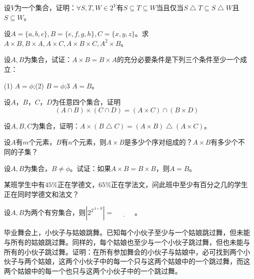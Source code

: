 \documentclass{article}
\begin{document}
\begin{CJK}{UTF8}{gbsn}
\begin{Exercise}
  设$V$为一个集合，证明：$\forall S,T,W \in 2^V$有$S \subseteq T \subseteq W$当且仅当$S \bigtriangleup T \subseteq S \bigtriangleup W$且$S \subseteq W$。
\end{Exercise}

\begin{Exercise}
  设$A=\{a,b,c\}, B=\{e,f,g,h\}, C=\{x,y,z\}$。求$A\times B, B\times A, A\times C, A\times B \times C, A^2\times B$。
\end{Exercise}

\begin{Exercise}
  设$A,B$为集合，试证：$A\times B= B\times A$的充分必要条件是下列三个条件至少一个成立：

  (1) $A=\phi$;(2) $B=\phi$;3 $A=B$。
\end{Exercise}

\begin{Exercise}
  设$A$，$B$，$C$，$D$为任意四个集合，证明
  \[(A\cap B) \times (C \cap D) = (A\times C)\cap (B \times D)\]
\end{Exercise}

\begin{Exercise}
  设$A,B,C$为集合，证明：$A\times(B\bigtriangleup C) = (A\times B)\bigtriangleup(A\times C)$。
\end{Exercise}

\begin{Exercise}
  设$A$有$m$个元素，$B$有$n$个元素，则$A\times B$是多少个序对组成的？$A\times B$有多少个不同的子集？
\end{Exercise}

\begin{Exercise}
  设$A,B$为集合，$B\neq \phi$。试证：如果$A\times B= B\times B$，则$A=B$。
\end{Exercise}

\begin{Exercise}
  某班学生中有$45\%$正在学德文，$65\%$正在学法文，问此班中至少有百分之几的学生正在同时学德文和法文？
\end{Exercise}

\begin{Exercise}
  设$A,B$为两个有穷集合，则$|2^{2^{A\times B}}|=\underline{\quad\quad\quad}$。
\end{Exercise}

\begin{Exercise}
  毕业舞会上，小伙子与姑娘跳舞。已知每个小伙子至少与一个姑娘跳过舞，但未能与所有的姑娘跳过舞。同样的，每个姑娘也至少与一个小伙子跳过舞，但也未能与所有的小伙子跳过舞。证明：在所有参加舞会的小伙子与姑娘中，必可找到两个小伙子与两个姑娘，这两个小伙子中的每一个只与这两个姑娘中的一个跳过舞，而这两个姑娘中的每一个也只与这两个小伙子中的一个跳过舞。
\end{Exercise}
\end{CJK}
\end{document}
